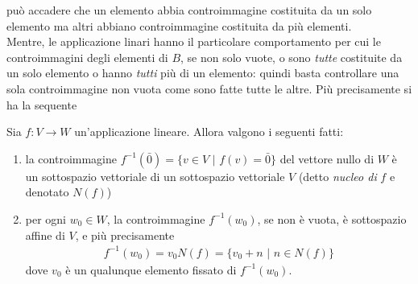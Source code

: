può accadere che un elemento abbia controimmagine costituita da un solo
elemento ma altri abbiano controimmagine costituita da più elementi.\\
Mentre, le applicazione linari hanno il particolare comportamento per cui
le controimmagini degli elementi di $B$, se non solo vuote, o sono
\textit{tutte} costituite da un solo elemento o hanno \textit{tutti} più
di un elemento: quindi basta controllare una sola controimmagine non vuota
come sono fatte tutte le altre. Più precisamente si ha la sequente
\begin{prop}
  \label{prop:iniediappllin1}
  Sia $f:V\to W$ un'applicazione lineare. Allora valgono i seguenti fatti:
  \begin{enumerate}
  \item la controimmagine $f^{-1}(\bar{0})=\{v\in V \text{ | }
    f(v)=\bar{0}\}$ del vettore nullo di $W$ è un sottospazio vettoriale
    di un sottospazio vettoriale $V$ (detto \textit{nucleo di} $f$ e
    denotato $N(f)$)
  \item per ogni $w_0\in W$, la controimmagine $f^{-1}(w_0)$, se non è
    vuota, è sottospazio affine di $V$, e più precisamente
    \begin{eqnarray*}
      f^{-1}(w_0)=v_0N(f)=\{v_0+n \text{ | } n\in N(f)\}
    \end{eqnarray*}
    dove $v_0$ è un qualunque elemento fissato di $f^{-1}(w_0)$.
  \end{enumerate}
\end{prop}
